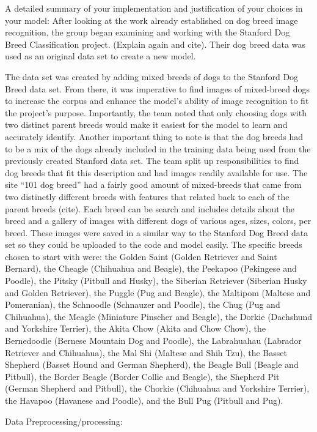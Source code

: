 \documentclass[12pt]{report}
\begin{document}
\indent	\par A detailed summary of your implementation and justification of your choices in your model:
After looking at the work already established on dog breed image recognition, the group began examining and working with the Stanford Dog Breed Classification project. (Explain again and cite). Their dog breed data was used as an original data set to create a new model. 
\par The data set was created by adding mixed breeds of dogs to the Stanford Dog Breed data set. From there, it was imperative to find images of mixed-breed dogs to increase the corpus and enhance the model’s ability of image recognition to fit the project’s purpose. Importantly, the team noted that only choosing dogs with two distinct parent breeds would make it easiest for the model to learn and accurately identify. Another important thing to note is that the dog breeds had to be a mix of the dogs already included in the training data being used from the previously created Stanford data set. The team split up responsibilities to find dog breeds that fit this description and had images readily available for use. The site “101 dog breed” had a fairly good amount of mixed-breeds that came from two distinctly different breeds with features that related back to each of the parent breeds (cite). Each breed can be search and includes details about the breed and a gallery of images with different dogs of various ages, sizes, colors, per breed. These images were saved in a similar way to the Stanford Dog Breed data set so they could be uploaded to the code and model easily. The specific breeds chosen to start with were: the Golden Saint (Golden Retriever and Saint Bernard), the Cheagle (Chihuahua and Beagle), the Peekapoo (Pekingese and Poodle), the Pitsky (Pitbull and Husky), the Siberian Retriever (Siberian Husky and Golden Retriever), the Puggle (Pug and Beagle), the Maltipom (Maltese and Pomeranian), the Schnoodle (Schnauzer and Poodle), the Chug (Pug and Chihuahua), the Meagle (Miniature Pinscher and Beagle), the Dorkie (Dachshund and Yorkshire Terrier), the Akita Chow (Akita and Chow Chow), the Bernedoodle (Bernese Mountain Dog and Poodle), the Labrahuahau (Labrador Retriever and Chihuahua), the Mal Shi (Maltese and Shih Tzu), the Basset Shepherd (Basset Hound and German Shepherd), the Beagle Bull (Beagle and Pitbull), the Border Beagle (Border Collie and Beagle), the Shepherd Pit (German Shepherd and Pitbull), the Chorkie (Chihuahua and Yorkshire Terrier), the Havapoo (Havanese and Poodle), and the Bull Pug (Pitbull and Pug). 
\par Data Preprocessing/processing:
		
\end{document}
